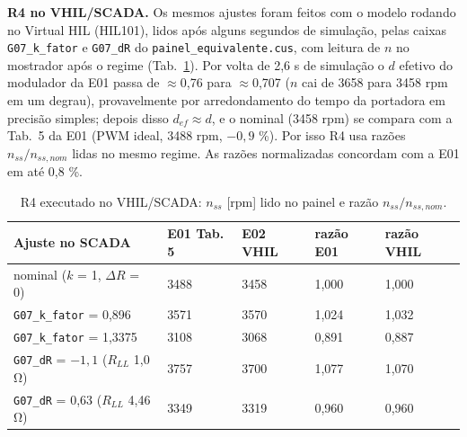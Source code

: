 \documentclass[10pt,a4paper]{article}
\begin{document}
\textbf{R4 no VHIL/SCADA.} Os mesmos ajustes foram feitos com o modelo rodando no Virtual HIL (HIL101), lidos após alguns segundos de simulação, pelas caixas \texttt{G07\_k\_fator} e \texttt{G07\_dR} do \texttt{painel\_equivalente.cus}, com leitura de $n$ no mostrador após o regime (Tab.~\ref{tab:vhil}). Por volta de 2,6 s de simulação o $d$ efetivo do modulador da E01 passa de $\approx$0,76 para $\approx$0,707 ($n$ cai de 3658 para 3458 rpm em um degrau), provavelmente por arredondamento do tempo da portadora em precisão simples; depois disso $d_{ef}\approx d$, e o nominal (3458 rpm) se compara com a Tab.~5 da E01 (PWM ideal, 3488 rpm, $-0{,}9$ \%). Por isso R4 usa razões $n_{ss}/n_{ss,nom}$ lidas no mesmo regime. As razões normalizadas concordam com a E01 em até 0,8 \%.
\begin{table}[!htbp]\centering\footnotesize
\caption{R4 executado no VHIL/SCADA: $n_{ss}$ [rpm] lido no painel e razão $n_{ss}/n_{ss,nom}$.}\label{tab:vhil}
\begin{tabular}{lllll}\toprule
Ajuste no SCADA & E01 Tab. 5 & E02 VHIL & razão E01 & razão VHIL\\\midrule
nominal ($k$ = 1, $\Delta R$ = 0) & 3488 & 3458 & 1,000 & 1,000\\
\texttt{G07\_k\_fator} = 0,896 & 3571 & 3570 & 1,024 & 1,032\\
\texttt{G07\_k\_fator} = 1,3375 & 3108 & 3068 & 0,891 & 0,887\\
\texttt{G07\_dR} = $-1{,}1$ ($R_{LL}$ 1,0 Ω) & 3757 & 3700 & 1,077 & 1,070\\
\texttt{G07\_dR} = 0,63 ($R_{LL}$ 4,46 Ω) & 3349 & 3319 & 0,960 & 0,960\\\bottomrule
\end{tabular}
\end{table}
\end{document}

